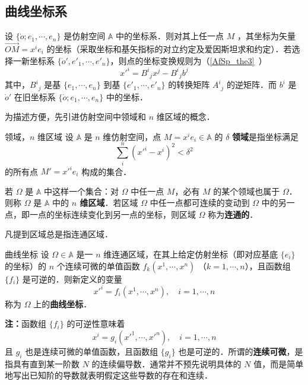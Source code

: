 
\begin{issues}
\issueDraft
\end{issues}

\subsection{曲线坐标系}
设 $\{\dot o;e_1,\cdots,e_n\}$ 是仿射空间 $\mathbb A$ 中的坐标系．则对其上任一点 $M$ ，其坐标为矢量 $\overrightarrow{OM}=x^i e_i$ 的坐标（采取坐标和基矢指标的对立约定及爱因斯坦求和约定）．若选择一新坐标系 $\{\dot o',e'_1,\cdots,e'_n\}$，则点的坐标变换规则为（\autoref{AfSp_the3}~）
\begin{equation}
x'^i={B^i}_jx^j-{B^i}_j b^j
\end{equation}
其中，${B^i}_j$ 是基 $\{e_1,\cdots,e_n\}$ 到基 $\{e'_1,\cdots,e'_n\}$ 的转换矩阵 ${A^i}_j$ 的逆矩阵．而 $b^i$ 是 $\dot o'$ 在旧坐标系 $\{\dot o;e_1,\cdots,e_n\}$  中的坐标．

为描述方便，先引进仿射空间中领域和 $n$ 维区域的概念．
\begin{definition}{领域，$n$ 维区域}
设 $\mathbb A$ 是 $n$ 维仿射空间，点 $M=x^ie_i\in\mathbb A$ 的 $\delta$ \textbf{领域}是指坐标满足
\begin{equation}
\sum_{i}^n(x'^i-x^i)^2<\delta^2
\end{equation}
的所有点 $M'=x'^i e_i$ 构成的集合．

若 $\Omega$ 是 $\mathbb A$ 中这样一个集合：对 $\Omega$ 中任一点 $M$，必有 $M$ 的某个领域也属于 $\Omega$．则称 $\Omega$ 是 $\mathbb A$ 中的\textbf{ $n$ 维区域}．若区域 $\Omega$ 中任一点都可连续的变动到 $\Omega$ 中的另一点，即一点的坐标连续变化到另一点的坐标，则区域 $\Omega$ 称为\textbf{连通的}．
\end{definition}

凡提到区域总是指连通区域．

\begin{definition}{曲线坐标}
设 $\Omega\in\mathbb A$ 是一 $n$ 维连通区域，在其上给定仿射坐标（即对应基底 $\{e_i\}$ 的坐标）的 $n$ 个连续可微的单值函数 $f_k(x^1,\cdots,x^n)$ （$k=1,\cdots,n$），且函数组 $\{f_i\}$ 是可逆的．则新定义的变量
\begin{equation}
x'^i=f_i(x^1,\cdots,x^n),\quad i=1,\cdots,n
\end{equation}
称为 $\Omega$ 上的\textbf{曲线坐标}．
\end{definition}

\textbf{注：}函数组 $\{f_i\}$ 的可逆性意味着
\begin{equation}
x^i=g_i(x'^1,\cdots,x'^n),\quad i=1,\cdots,n
\end{equation}
且 $g_i$ 也是连续可微的单值函数，且函数组 $\{g_i\}$ 也是可逆的．所谓的\textbf{连续可微}，是指具有直到某一阶数 $N$ 的连续偏导数．通常并不预先说明具体的 $N$ 值，而是简单地写出已知阶的导数就表明假定这些导数的存在和连续．